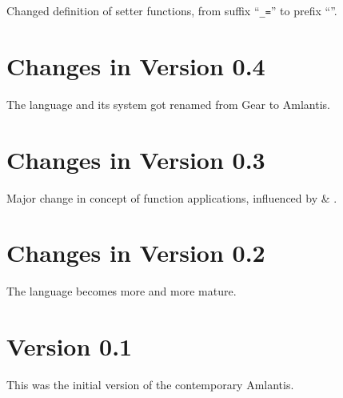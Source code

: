 Changed definition of setter functions, from suffix ``\lstinline!_=!'' to prefix ``''. 

\section*{Changes in Version 0.4}

The language and its system got renamed from Gear to Amlantis. 

\section*{Changes in Version 0.3}

Major change in concept of function applications, influenced by  \& . 

\section*{Changes in Version 0.2}

The language becomes more and more mature.

\section*{Version 0.1}

This was the initial version of the contemporary Amlantis. 
